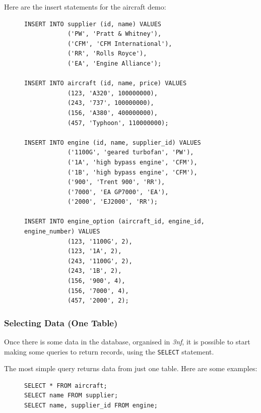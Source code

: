 \documentclass[9pt]{article}
\begin{document}
Here are the insert statements for the aircraft demo:

\begin{figure}[H]
\begin{verbatim}
INSERT INTO supplier (id, name) VALUES
            ('PW', 'Pratt & Whitney'),
            ('CFM', 'CFM International'),
            ('RR', 'Rolls Royce'),
            ('EA', 'Engine Alliance');

INSERT INTO aircraft (id, name, price) VALUES
            (123, 'A320', 100000000),
            (243, '737', 100000000),
            (156, 'A380', 400000000),
            (457, 'Typhoon', 110000000);

INSERT INTO engine (id, name, supplier_id) VALUES
            ('1100G', 'geared turbofan', 'PW'),
            ('1A', 'high bypass engine', 'CFM'),
            ('1B', 'high bypass engine', 'CFM'),
            ('900', 'Trent 900', 'RR'),
            ('7000', 'EA GP7000', 'EA'),
            ('2000', 'EJ2000', 'RR');

INSERT INTO engine_option (aircraft_id, engine_id, engine_number) VALUES
            (123, '1100G', 2),
            (123, '1A', 2),
            (243, '1100G', 2),
            (243, '1B', 2),
            (156, '900', 4),
            (156, '7000', 4),
            (457, '2000', 2);
\end{verbatim}
\end{figure}

\subsubsection{Selecting Data (One Table)}
\label{sec:orgaff955d}

Once there is some data in the database, organised in \emph{3nf}, it is possible to start making some queries to return records, using the \texttt{SELECT} statement.

The most simple query returns data from just one table. Here are some examples:

\begin{figure}[H]
\begin{verbatim}
SELECT * FROM aircraft;
SELECT name FROM supplier;
SELECT name, supplier_id FROM engine;
\end{verbatim}
\end{figure}
\end{document}

